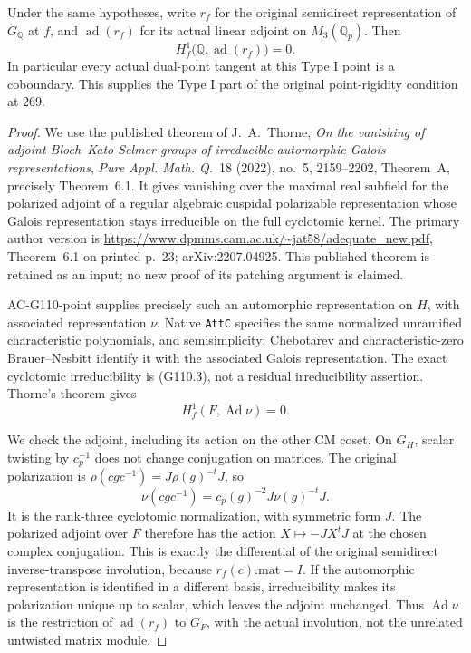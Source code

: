 \begin{theorem}
\label{AC-G110-rigidity}
Under the same hypotheses, write \(r_f\) for the original
semidirect representation of \(G_{\mathbb Q}\) at \(f\),
and \(\operatorname{ad}(r_f)\) for its actual linear
adjoint on \(M_3(\overline{\mathbb Q}_p)\). Then
\[
        H^1_f\bigl(\mathbb Q,\operatorname{ad}(r_f)\bigr)=0.
 \tag{G110.10}
\]
In particular every actual dual-point tangent at this Type I
point is a coboundary. This supplies the Type I part of the
original point-rigidity condition at \(269\).
\end{theorem}
\begin{proof}
We use the published theorem of J.~A.~Thorne,
\emph{On the vanishing of adjoint Bloch--Kato Selmer groups
of irreducible automorphic Galois representations},
\emph{Pure Appl. Math. Q.}~18 (2022), no.~5, 2159--2202,
Theorem~A, precisely Theorem~6.1. It gives vanishing over
the maximal real subfield for the polarized adjoint of a
regular algebraic cuspidal polarizable representation
whose Galois representation stays irreducible on the full
cyclotomic kernel. The primary author version is
\url{https://www.dpmms.cam.ac.uk/~jat58/adequate_new.pdf},
Theorem~6.1 on printed p.~23; arXiv:2207.04925.
This published theorem is retained as an input; no new
proof of its patching argument is claimed.

AC-G110-point supplies precisely such an automorphic
representation on \(H\), with associated representation
\(\nu\). Native \texttt{AttC} specifies the same normalized
unramified characteristic polynomials, and semisimplicity;
Chebotarev and characteristic-zero Brauer--Nesbitt identify
it with the associated Galois representation. The exact
cyclotomic irreducibility is (G110.3), not a residual
irreducibility assertion. Thorne's theorem gives
\[
                    H^1_f(F,\operatorname{Ad}\nu)=0.
 \tag{G110.11}
\]

We check the adjoint, including its action on the other
CM coset. On \(G_H\), scalar twisting by \(c_p^{-1}\)
does not change conjugation on matrices. The original
polarization is
\(\rho(cgc^{-1})=J\rho(g)^{-t}J\), so
\[
             \nu(cgc^{-1})
                    =c_p(g)^{-2}J\nu(g)^{-t}J.
 \tag{G110.12}
\]
It is the rank-three cyclotomic normalization, with
symmetric form \(J\). The polarized adjoint over \(F\)
therefore has the action \(X\mapsto-JX^tJ\) at the
chosen complex conjugation. This is exactly the
differential of the original semidirect inverse-transpose
involution, because \(r_f(c).\mathrm{mat}=I\).
If the automorphic representation is identified in a
different basis, irreducibility makes its polarization
unique up to scalar, which leaves the adjoint unchanged.
Thus \(\operatorname{Ad}\nu\) is the restriction of
\(\operatorname{ad}(r_f)\) to \(G_F\), with the actual
involution, not the unrelated untwisted matrix module.


\end{proof}
